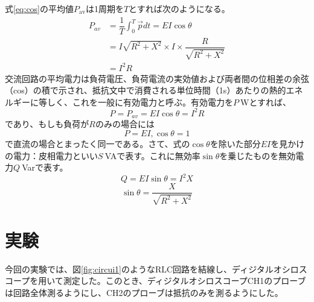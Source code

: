 \documentclass[10pt,a4paper]{jsarticle}
\numberwithin{equation}{section}
\numberwithin{figure}{section}
\numberwithin{table}{section}
\begin{document}
  式\ref{eq:cos}の平均値$P_{\mathrm{av}}$は1周期を$T$とすれば次のようになる。
  \begin{equation}
    \begin{split}
      P_{av} &= \dfrac{1}{T}\int_{0}^{T}\vec{p} dt =EI \cos\theta\\
      &=I \sqrt{R^2 + X^2}\times I \times \dfrac{R}{\sqrt{R^2 + X^2}}\\
      &=I^2R\label{eq:pav}
    \end{split}
  \end{equation}
  交流回路の平均電力は負荷電圧、負荷電流の実効値および両者間の位相差の余弦（cos）の積で示され、抵抗文中で消費される単位時間（1s）あたりの熱的エネルギーに等しく、これを一般に有効電力と呼ぶ。有効電力を$P\:$Wとすれば、
  \begin{equation}
    P=P_{av} = EI\cos\theta = I^2R \label{eq:有効電力}
  \end{equation}
  であり、もしも負荷が$R$のみの場合には
  \begin{equation}
    P=EI,\cos\theta=1
  \end{equation}
  で直流の場合とまったく同一である。さて、式の$\cos\theta$を除いた部分$EI$を見かけの電力：皮相電力といい$S\:$VAで表す。これに無効率$\sin\theta$を乗じたものを無効電力$Q\:$Varで表す。
  \begin{equation}
    Q=EI\sin\theta=I^2X
  \end{equation}
  \begin{equation}
    \sin\theta=\dfrac{X}{\sqrt{R^2 + X^2}}
  \end{equation}
  \clearpage
  \section{実験}
  今回の実験では、図\ref{fig:circui1}のようなRLC回路を結線し、ディジタルオシロスコープを用いて測定した。このとき、ディジタルオシロスコープCH1のプローブは回路全体測るようにし、CH2のプローブは抵抗のみを測るようにした。
\end{document}

